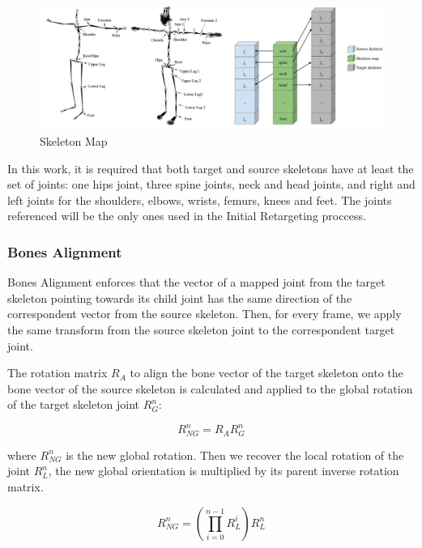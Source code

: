 \documentclass{vgtc}
\makeatletter
\def\maxwidth{\ifdim\Gin@nat@width>\linewidth\linewidth
    \else\Gin@nat@width\fi}
\let\Oldincludegraphics\includegraphics
\renewcommand{\includegraphics}[1]{\Oldincludegraphics[width=.8\maxwidth]{#1}}
\makeatother
\begin{document}
\begin{figure}
\centering
\includegraphics{../figures/skelmap.png}
\caption{Skeleton Map}
\end{figure}

In this work, it is required that both target and source skeletons have
at least the set of joints: one hips joint, three spine joints, neck and
head joints, and right and left joints for the shoulders, elbows,
wrists, femurs, knees and feet. The joints referenced will be the only
ones used in the Initial Retargeting proccess.

\subsubsection{Bones Alignment}\label{bones-alignment}

Bones Alignment enforces that the vector of a mapped joint from the
target skeleton pointing towards its child joint has the same direction
of the correspondent vector from the source skeleton. Then, for every
frame, we apply the same transform from the source skeleton joint to the
correspondent target joint.

The rotation matrix \(R_{A}\) to align the bone vector of the target
skeleton onto the bone vector of the source skeleton is calculated and
applied to the global rotation of the target skeleton joint
\(R_{G}^{n}\):

\begin{equation}
        \label{eq:newglobal}
        R_{NG}^{n} = R_{A} R_{G}^{n}
        \end{equation}

where \(R_{NG}^{n}\) is the new global rotation. Then we recover the
local rotation of the joint \(R_{L}^{n}\), the new global orientation is
multiplied by its parent inverse rotation matrix.

\begin{equation}
        \label{eq:newglobal2}
        R_{NG}^{n} = \left(\prod_{i=0}^{n-1} R_{L}^{i}\right) R_{L}^{n} 
        \end{equation}
\end{document}
